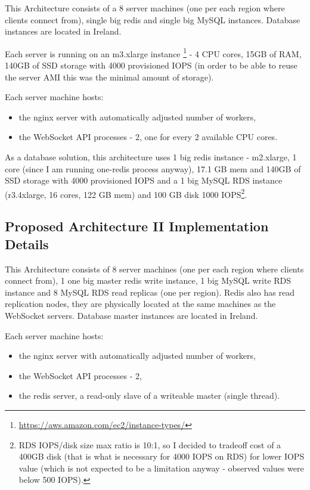 \documentclass{uvamscse}
\begin{document}
This Architecture consists of a 8 server machines (one per each region where clients connect from), single big redis and single big MySQL instances. Database instances are located in Ireland.

Each server is running on an m3.xlarge instance \footnote{\url{https://aws.amazon.com/ec2/instance-types/}} - 4 CPU cores, 15GB of RAM, 140GB of SSD storage with 4000 provisioned IOPS (in order to be able to reuse the server AMI this was the minimal amount of storage).

Each server machine hosts:
\begin{itemize}
  \item the nginx server with automatically adjusted number of workers,
  \item the WebSocket API processes - 2, one for every 2 available CPU cores.
\end{itemize}

As a database solution, this architecture uses 1 big redis instance - m2.xlarge, 1 core (since I am running one-redis process anyway), 17.1 GB mem and 140GB of SSD storage with 4000 provisioned IOPS and a 1 big MySQL RDS instance (r3.4xlarge, 16 cores, 122 GB mem) and 100 GB disk 1000 IOPS\footnote{RDS IOPS/disk size max ratio is 10:1, so I decided to tradeoff cost of a 400GB disk (that is what is necessary for 4000 IOPS on RDS) for lower IOPS value (which is not expected to be a limitation anyway - observed values were below 500 IOPS).}.

\subsection{Proposed Architecture II Implementation Details}\label{Proposed Architecture II Implementation Details}

This Architecture consists of 8 server machines (one per each region where clients connect from), 1 one big master redis write instance, 1 big MySQL write RDS instance and 8 MySQL RDS read replicas (one per region). Redis also has read replication nodes, they are physically located at the same machines as the WebSocket servers. Database master instances are located in Ireland.

Each server machine hosts:
\begin{itemize}
  \item the nginx server with automatically adjusted number of workers,
  \item the WebSocket API processes - 2,
  \item the redis server, a read-only slave of a writeable master (single thread).
\end{itemize}
\end{document}
